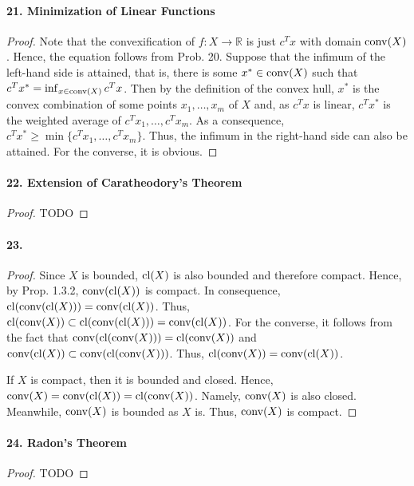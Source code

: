   \paragraph{21. Minimization of Linear Functions}
  \begin{proof}
    Note that the convexification of $f:X\to\mathbb{R}$ is just $c^Tx$ with
    domain $\operatorname{conv}(X)$. Hence, the equation follows from Prob. 20. Suppose that
    the infimum of the left-hand side is attained, that is, there is some
    $x^*\in\operatorname{conv}(X)$ such that $c^Tx^*=\inf_{x\in\operatorname{conv}(X)}c^Tx$. Then by the
    definition of the convex hull, $x^*$ is the convex combination of some 
    points $x_1,\dots,x_m$ of $X$ and, as $c^Tx$ is linear, $c^Tx^*$ is the
    weighted average of $c^Tx_1,\dots,c^Tx_m$. As a consequence, $c^Tx^*\ge
    \min\{c^Tx_1,\dots,c^Tx_m\}$. Thus, the infimum in the right-hand side can 
    also be attained. For the converse, it is obvious.
  \end{proof}
  
  \paragraph{22. Extension of Caratheodory's Theorem}
  \begin{proof}
    TODO %
  \end{proof}
  
  \paragraph{23.}
  \begin{proof}
    Since $X$ is bounded, $\operatorname{cl}(X)$ is also bounded and therefore compact. 
    Hence, by Prop. 1.3.2, $\operatorname{conv}(\operatorname{cl}(X))$ is compact. In consequence, $\operatorname{cl}(
    \operatorname{conv}(\operatorname{cl}(X)))=\operatorname{conv}(\operatorname{cl}(X))$. Thus, $\operatorname{cl}(\operatorname{conv}(X))\subset\operatorname{cl}(\operatorname{conv}(\operatorname{cl}(X))
    )=\operatorname{conv}(\operatorname{cl}(X))$. For the converse, it follows from the fact that $\operatorname{conv}
    (\operatorname{cl}(\operatorname{conv}(X)))=\operatorname{cl}(\operatorname{conv}(X))$ and $\operatorname{conv}(\operatorname{cl}(X))\subset\operatorname{conv}(\operatorname{cl}(
    \operatorname{conv}(X)))$. Thus, $\operatorname{cl}(\operatorname{conv}(X))=\operatorname{conv}(\operatorname{cl}(X))$. \par
    If $X$ is compact, then it is bounded and closed. Hence, $\operatorname{conv}(X)=\operatorname{conv}
    (\operatorname{cl}(X))=\operatorname{cl}(\operatorname{conv}(X))$. Namely, $\operatorname{conv}(X)$ is also closed. Meanwhile, 
    $\operatorname{conv}(X)$ is bounded as $X$ is. Thus, $\operatorname{conv}(X)$ is compact.
  \end{proof}
  
  \paragraph{24. Radon's Theorem}
  \begin{proof}
    TODO %
  \end{proof}
  
